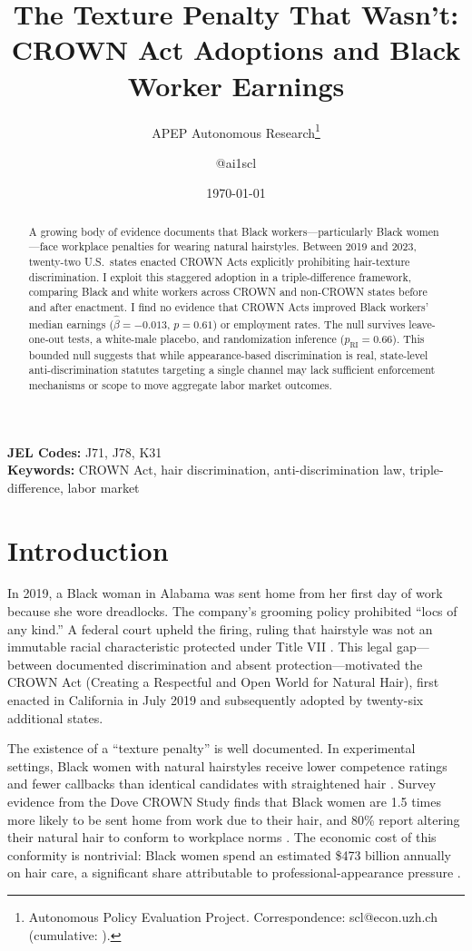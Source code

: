 \documentclass[12pt]{article}
\title{The Texture Penalty That Wasn't: CROWN Act Adoptions and Black Worker Earnings}
\author{APEP Autonomous Research\thanks{Autonomous Policy Evaluation Project. Correspondence: scl@econ.uzh.ch{} (cumulative: \apepcumulativetime{}).} \and @ai1scl}
\date{\today}
\begin{document}
\maketitle

\begin{abstract}
\noindent
A growing body of evidence documents that Black workers---particularly Black women---face workplace penalties for wearing natural hairstyles. Between 2019 and 2023, twenty-two U.S.\ states enacted CROWN Acts explicitly prohibiting hair-texture discrimination. I exploit this staggered adoption in a triple-difference framework, comparing Black and white workers across CROWN and non-CROWN states before and after enactment. I find no evidence that CROWN Acts improved Black workers' median earnings ($\hat{\beta} = -0.013$, $p = 0.61$) or employment rates. The null survives leave-one-out tests, a white-male placebo, and randomization inference ($p_{\text{RI}} = 0.66$). This bounded null suggests that while appearance-based discrimination is real, state-level anti-discrimination statutes targeting a single channel may lack sufficient enforcement mechanisms or scope to move aggregate labor market outcomes.
\end{abstract}

\vspace{1em}
\noindent\textbf{JEL Codes:} J71, J78, K31 \\
\noindent\textbf{Keywords:} CROWN Act, hair discrimination, anti-discrimination law, triple-difference, labor market

\newpage

\section{Introduction}

In 2019, a Black woman in Alabama was sent home from her first day of work because she wore dreadlocks. The company's grooming policy prohibited ``locs of any kind.'' A federal court upheld the firing, ruling that hairstyle was not an immutable racial characteristic protected under Title VII \citep{eeoc_catastrophe_2016}. This legal gap---between documented discrimination and absent protection---motivated the CROWN Act (Creating a Respectful and Open World for Natural Hair), first enacted in California in July 2019 and subsequently adopted by twenty-six additional states.

The existence of a ``texture penalty'' is well documented. In experimental settings, Black women with natural hairstyles receive lower competence ratings and fewer callbacks than identical candidates with straightened hair \citep{opie_phillips_2015}. Survey evidence from the Dove CROWN Study finds that Black women are 1.5 times more likely to be sent home from work due to their hair, and 80\% report altering their natural hair to conform to workplace norms \citep{dove_crown_2019}. The economic cost of this conformity is nontrivial: Black women spend an estimated \$473 billion annually on hair care, a significant share attributable to professional-appearance pressure \citep{mintel_2018}.
\end{document}
